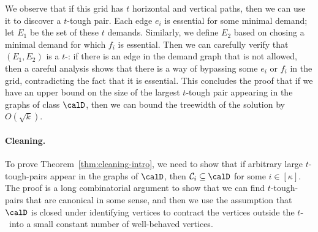 We observe that if this grid has $t$ horizontal and vertical paths, then we can use it to discover a $t$-tough pair. Each edge $e_i$ is essential for some minimal demand; let $E_1$ be the set of these $t$ demands. Similarly, we define $E_2$ based on chosing a minimal demand for which $f_i$ is essential. Then we can carefully verify that $(E_1,E_2)$ is a $t$-\toughpair: if there is an edge in the demand graph that is not allowed, then a careful analysis shows that there is a way of bypassing some $e_i$ or $f_i$ in the grid, contradicting the fact that it is essential. This concludes the proof that if we have an upper bound on the size of the largest $t$-tough pair appearing in the graphs of class $\calD$, then we can bound the treewidth of the solution by $O(\sqrt{k})$.

 \paragraph{Cleaning.}
 To prove Theorem~\ref{thm:cleaning-intro}, we need to show that if arbitrary large $t$-tough-pairs appear in the graphs of $\calD$, then $\mathcal{C}_i\subseteq \calD$ for some $i\in[\kappa]$. The proof is a long combinatorial argument to show that we can find $t$-tough-pairs that are canonical in some sense, and then we use the assumption that $\calD$ is closed under identifying vertices to contract the vertices outside the $t$-\toughpair\ into a small constant number of well-behaved vertices.

